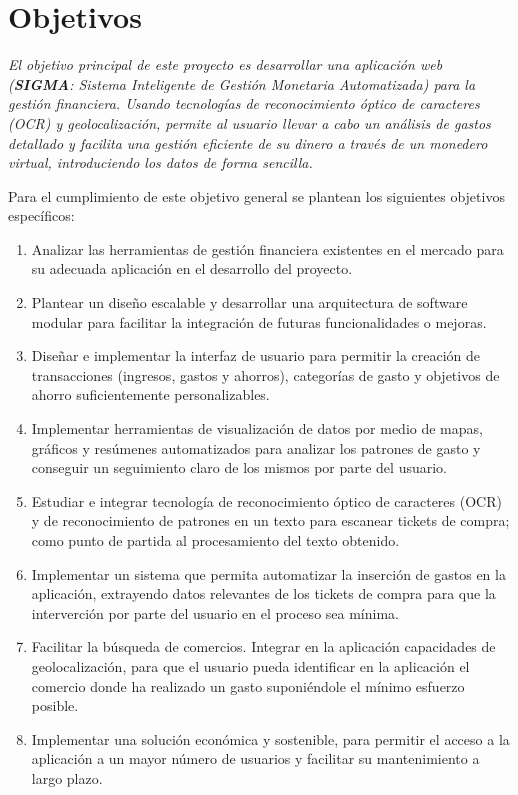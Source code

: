 \section{Objetivos} \label{sect:goals}
\textit{El objetivo principal de este proyecto es desarrollar una aplicación web (\textbf{SIGMA}: Sistema Inteligente de Gestión Monetaria Automatizada) 
para la gestión financiera. Usando tecnologías de reconocimiento
óptico de caracteres (OCR) y geolocalización, permite al usuario llevar a cabo un 
análisis de gastos detallado y facilita una gestión eficiente de su dinero
a través de un monedero virtual, introduciendo los datos de 
forma sencilla.}

Para el cumplimiento de este objetivo general se plantean los siguientes objetivos específicos:
\begin{enumerate}
    \item Analizar las herramientas de gestión financiera existentes en el mercado para su adecuada aplicación en el desarrollo del proyecto.  
    \item Plantear un diseño escalable y desarrollar una arquitectura de software modular para facilitar la integración de futuras funcionalidades o mejoras.
    \item Diseñar e implementar la interfaz de usuario para permitir la creación 
         de transacciones (ingresos, gastos y ahorros), categorías de gasto y objetivos de ahorro suficientemente personalizables. \label{obj:O3}
    \item Implementar herramientas de visualización de datos por medio de mapas, gráficos y resúmenes automatizados para analizar los patrones de gasto y conseguir un seguimiento claro de los mismos por parte del usuario.\label{obj:O4}
    \item Estudiar e integrar tecnología de reconocimiento óptico de caracteres (OCR) y de reconocimiento de patrones en un texto para escanear tickets de compra; como punto de partida al procesamiento del texto obtenido. \label{obj:05}
    \item Implementar un sistema que permita automatizar la inserción de gastos en la aplicación, extrayendo datos relevantes de los tickets de compra para que la interverción por parte del usuario en el proceso sea mínima.\label{obj:06}
    \item Facilitar la búsqueda de comercios. Integrar en la aplicación capacidades de geolocalización, para que el usuario pueda identificar en la aplicación el comercio donde ha realizado un gasto suponiéndole el mínimo esfuerzo posible.\label{obj:O7}
    \item Implementar una solución económica y sostenible, para permitir el acceso a la aplicación a un mayor número de usuarios y facilitar su mantenimiento a largo plazo.\label{obj:O8}
\end{enumerate}